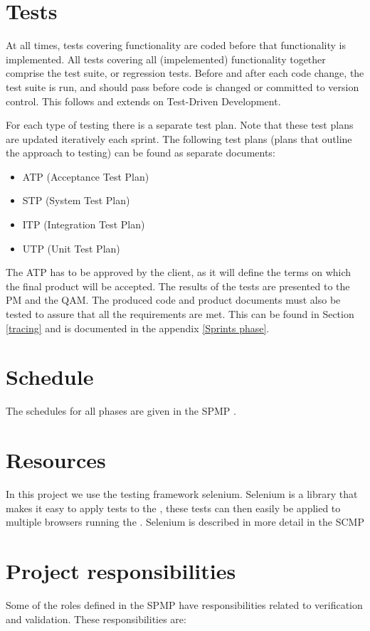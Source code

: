 \section{Tests}
At all times, tests covering functionality are coded before that functionality is implemented. 
All tests covering all (impelemented) functionality together comprise the test suite, or regression tests.
Before and after each code change, the test suite is run, and should pass before code is changed or committed to version control. This follows and extends on Test-Driven Development.

 For each type of testing there is a separate test plan. 
Note that these test plans are updated iteratively each sprint. The following test plans (plans that outline the approach to testing) can be found as separate documents:

\begin{itemize}
\item ATP (Acceptance Test Plan) \cite{atp}
\item STP (System Test Plan) \cite{stp}
\item ITP (Integration Test Plan) \cite{itp}
\item UTP (Unit Test Plan) \cite{utp}
\end{itemize}

The ATP \cite{atp} has to be approved by the client, as it will define the terms on which the final product will be accepted. The results of the tests are presented to the PM and the QAM. The produced code and product documents must also be tested to assure that all the requirements are met. This can be found in Section \ref{tracing} and is documented in the appendix \ref{Sprints phase}.

\section{Schedule}
The schedules for all phases are given in the SPMP \cite{spmp}.

\section{Resources}
In this project we use the testing framework selenium. Selenium is a library that makes it easy to apply tests to the \applicationname{}, these tests can then easily be applied to multiple browsers running the \applicationname{}. Selenium is described in more detail in the SCMP\cite{scmp}

\section{Project responsibilities}
    Some of the roles defined in the SPMP have responsibilities related to verification and validation.
    These responsibilities are:\\

